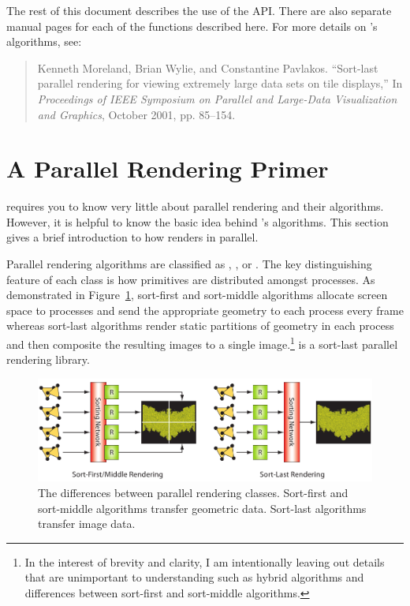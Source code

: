 The rest of this document describes the use of the
\IceT
API.  There are also separate manual pages for each of the functions
described here.  For more details on
\IceT's
algorithms, see:

\begin{quote}
  Kenneth Moreland, Brian Wylie, and Constantine Pavlakos.  ``Sort-last
  parallel rendering for viewing extremely large data sets on tile
  displays,'' In \emph{Proceedings of IEEE Symposium on Parallel and
    Large-Data Visualization and Graphics}, October 2001, pp. 85--154.
\end{quote}


\section{A Parallel Rendering Primer}
\label{sec:Introduction:Parallel_Rendering_Primer}

\IceT requires you to know very little about parallel rendering and their
algorithms.  However, it is helpful to know the basic idea behind \IceT's
algorithms.  This section gives a brief introduction to how \IceT renders
in parallel.

Parallel rendering algorithms are classified as
,
, or
.  The key distinguishing feature of
each class is how primitives are distributed amongst processes.  As
demonstrated in Figure~\ref{fig:Introduction:ParallelRenderingClasses},
sort-first and sort-middle algorithms allocate screen space to processes
and send the appropriate geometry to each process every frame whereas
sort-last algorithms render static partitions of geometry in each process
and then composite the resulting images to a single image.\footnote{In the
  interest of brevity and clarity, I am intentionally leaving out details
  that are unimportant to understanding \IceT such as hybrid algorithms and
  differences between sort-first and sort-middle algorithms.}  \IceT is a
sort-last parallel rendering library.

\begin{figure}
  \includegraphics{images/ParallelRenderingClasses}
  \caption[Parallel rendering classes.]{The differences between parallel
    rendering classes.  Sort-first and sort-middle algorithms transfer
    geometric data.  Sort-last algorithms transfer image data.}
  \label{fig:Introduction:ParallelRenderingClasses}
\end{figure}

